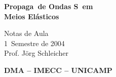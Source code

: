 \documentclass[12pt]{report}
\begin{document}
\thispagestyle{empty}

\begin{center}
\vspace*{2cm}

{\huge\bf Propaga\cao\ de Ondas S\ismicas\ em \\[0.3cm]
Meios El\'asticos}

\vfill

{\large Notas de Aula} \\[0.5cm]
{\large 1\uo\ Semestre de 2004} \\[0.5cm]
{\large Prof. J\"org Schleicher} 

\vfill

{\large\bf DMA -- IMECC -- UNICAMP}

\vspace*{1cm}

\end{center}

\newpage
\setcounter{page}{1}

\tableofcontents






%

%
%

\end{document}
